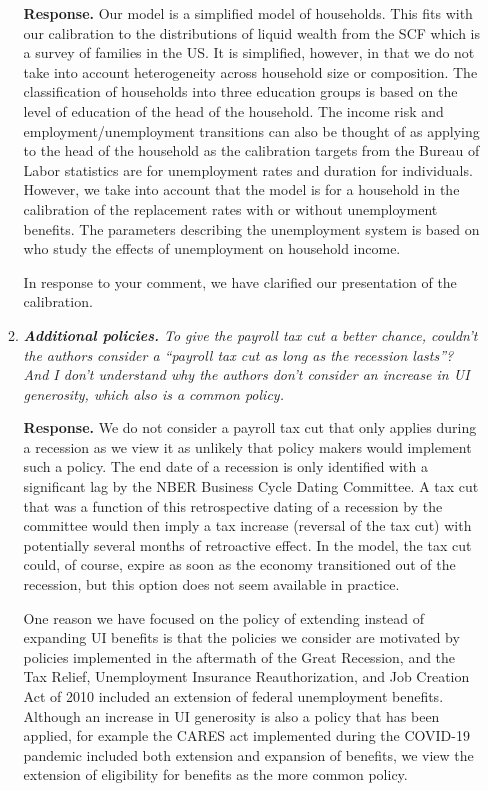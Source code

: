 \documentclass[12pt,letterpaper,english]{article}
\begin{document}
\begin{enumerate}
\begin{enumerate}
		\noindent \textbf{Response.} Our model is a simplified model of households. This fits with our calibration to the distributions of liquid wealth from the SCF which is a survey of families in the US. It is simplified, however, in that we do not take into account heterogeneity across household size or composition. The classification of households into three education groups is based on the level of education of the head of the household. The income risk and employment/unemployment transitions can also be thought of as applying to the head of the household as the calibration targets from the Bureau of Labor statistics are for unemployment rates and duration for individuals. However, we take into account that the model is for a household in the calibration of the replacement rates with or without unemployment benefits. The parameters describing the unemployment system is based on \citet{rothstein2017scraping} who study the effects of unemployment on household income. 
		
		In response to your comment, we have clarified our presentation of the calibration. 
		
		\item \textit{\textbf{Additional policies.} To give the payroll tax cut a better chance, couldn't the authors consider a ``payroll tax cut as long as the recession lasts''? And I don't understand why the authors don't consider an increase in UI generosity, which also is a common policy.}
						
		\noindent \textbf{Response.} We do not consider a payroll tax cut that only applies during a recession as we view it as unlikely that policy makers would implement such a policy. The end date of a recession is only identified with a significant lag by the NBER Business Cycle Dating Committee. A tax cut that was a function of this retrospective dating of a recession by the committee would then imply a tax increase (reversal of the tax cut) with potentially several months of retroactive effect. In the model, the tax cut could, of course, expire as soon as the economy transitioned out of the recession, but this option does not seem available in practice. 
		
		One reason we have focused on the policy of extending instead of expanding UI benefits is that the policies we consider are motivated by policies implemented in the aftermath of the Great Recession, and the Tax Relief, Unemployment Insurance Reauthorization, and Job Creation Act of 2010 included an extension of federal unemployment benefits. Although an increase in UI generosity is also a policy that has been applied, for example the CARES act implemented during the COVID-19 pandemic included both extension and expansion of benefits, we view the extension of eligibility for benefits as the more common policy. 
		

\end{enumerate}
\end{enumerate}
\end{document}
